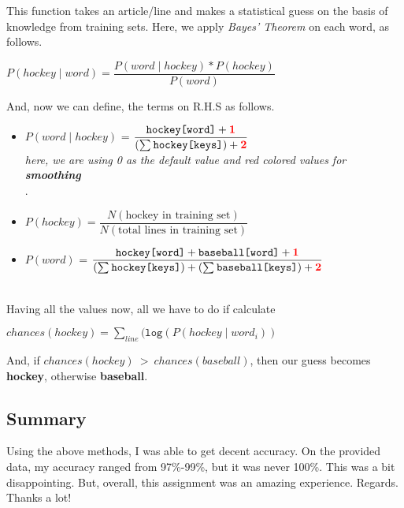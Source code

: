\documentclass{article}
\begin{document}
\begin{itemize}
\begin{center}
\begin{itemize}
                This function takes an article/line and makes a statistical guess on the basis of knowledge from training sets. Here, we apply \emph{Bayes' Theorem} on each word, as follows. \\
                \begin{center}
                    \(P(hockey \mid word) = \dfrac{P(word \mid hockey)*P(hockey)}{P(word)}\)
                \end{center}
                And, now we can define, the terms on R.H.S as follows.
                \vspace{+5mm}
                \begin{itemize}
                    \item \(P(word\mid hockey)\) = \(\dfrac{\texttt{hockey[word]}+\textcolor{red}{\textbf{1}}}{(\sum_{}^{}\texttt{hockey[keys]})+\textcolor{red}{\textbf{2}}}\) \\[2mm]
                    {\scriptsize \emph{     here, we are using 0 as the default value and red colored values for \textbf{smoothing} \\}.}
                    \item \(P(hockey) = \dfrac{N(\text{hockey in training set})}{N(\text{total lines in training set})}\) \ \\[5mm] 
                    \item \(P(word)\) = \(\dfrac{\texttt{hockey[word]}+\texttt{baseball[word]}+\textcolor{red}{\textbf{1}}}{(\sum_{}^{}\texttt{hockey[keys]})+(\sum_{}^{}\texttt{baseball[keys]})+\textcolor{red}{\textbf{2}}}\)
                \end{itemize}
                \  \\[5mm]Having all the values now, all we have to do if calculate \\
                \begin{center}
                    \(chances(hockey) = \sum_{line}(\texttt{log}(P(hockey\mid word_i))\)
                \end{center}
                And, if \(chances(hockey)\ \mathcal{>} \  chances(baseball)\), then our guess becomes \textbf{hockey}, otherwise \textbf{baseball}.
            \end{itemize}
        \end{center}
    \end{itemize}
    
    \subsection*{Summary}
    Using the above methods, I was able to get decent accuracy. On the provided data, my accuracy ranged from 97\%-99\%, but it was never 100\%. This was a bit disappointing. But, overall, this assignment was an amazing experience. Regards. Thanks a lot!
\end{document}
